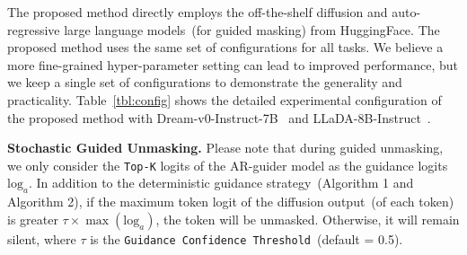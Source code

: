 
The proposed method directly employs the off-the-shelf diffusion and auto-regressive large language models~(for guided masking) from HuggingFace. The proposed method uses the same set of configurations for all tasks. We believe a more fine-grained hyper-parameter setting can lead to improved performance, but we keep a single set of configurations to demonstrate the generality and practicality. Table~\ref{tbl:config} shows the detailed experimental configuration of the proposed method with Dream-v0-Instruct-7B~\cite{dream2025} and LLaDA-8B-Instruct~\cite{nie2025large}.

\textbf{Stochastic Guided Unmasking.} Please note that during guided unmasking, we only consider the \texttt{Top-K} logits of the AR-guider model as the guidance logits $\text{log}_a$.
In addition to the deterministic guidance strategy~(Algorithm 1 and Algorithm 2), if the maximum token logit of the diffusion output~(of each token) is greater $\tau \times \max(\text{log}_a)$, the token will be unmasked. Otherwise, it will remain silent, where $\tau$ is the \texttt{Guidance Confidence Threshold}~(default = 0.5). 

\begin{table}[h!]
\centering
\caption{Diffusion configuration of the Dream-v0-Instruct-7B~\cite{dream2025} and LLaDA-8B-Instruct~\cite{nie2025large} employed in this work.}
\label{tbl:config}
\end{table}
